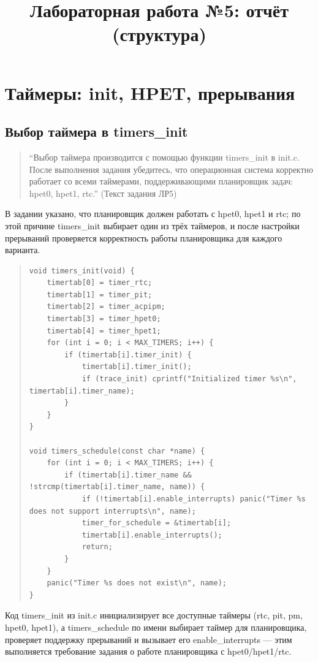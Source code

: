 \documentclass[a4paper,12pt]{article}
\title{Лабораторная работа №5: отчёт (структура)}
\author{}
\date{}
\begin{document}
\maketitle
\tableofcontents
\newpage


\section{Таймеры: init, HPET, прерывания}


\subsection{Выбор таймера в timers\_init}
\begin{quote}
``Выбор таймера производится с помощью функции timers\_init в init.c. После выполнения задания убедитесь, что операционная система корректно работает со всеми таймерами, поддерживающими планировщик задач: hpet0, hpet1, rtc.'' (Текст задания ЛР5)
\end{quote}
В задании указано, что планировщик должен работать с hpet0, hpet1 и rtc; по этой причине timers\_init выбирает один из трёх таймеров, и после настройки прерываний проверяется корректность работы планировщика для каждого варианта.
\begin{quote}\begin{verbatim}
void timers_init(void) {
    timertab[0] = timer_rtc;
    timertab[1] = timer_pit;
    timertab[2] = timer_acpipm;
    timertab[3] = timer_hpet0;
    timertab[4] = timer_hpet1;
    for (int i = 0; i < MAX_TIMERS; i++) {
        if (timertab[i].timer_init) {
            timertab[i].timer_init();
            if (trace_init) cprintf("Initialized timer %s\n", timertab[i].timer_name);
        }
    }
}

void timers_schedule(const char *name) {
    for (int i = 0; i < MAX_TIMERS; i++) {
        if (timertab[i].timer_name && !strcmp(timertab[i].timer_name, name)) {
            if (!timertab[i].enable_interrupts) panic("Timer %s does not support interrupts\n", name);
            timer_for_schedule = &timertab[i];
            timertab[i].enable_interrupts();
            return;
        }
    }
    panic("Timer %s does not exist\n", name);
}
\end{verbatim}\end{quote}
Код timers\_init из init.c инициализирует все доступные таймеры (rtc, pit, pm, hpet0, hpet1), а timers\_schedule по имени выбирает таймер для планировщика, проверяет поддержку прерываний и вызывает его enable\_interrupts — этим выполняется требование задания о работе планировщика с hpet0/hpet1/rtc.
\end{document}
